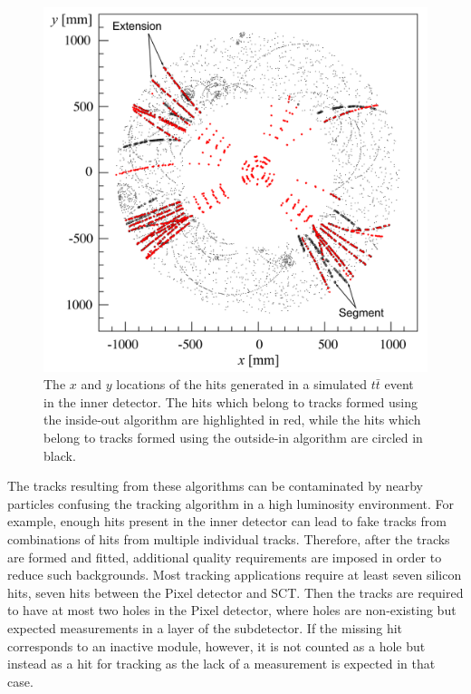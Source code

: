 \begin{figure}
\includegraphics[width=\fullfig]{figures/track_patterns.png}
\caption{The $x$ and $y$ locations of the hits generated in a simulated $t\bar{t}$ event in the inner detector. The hits which belong to tracks formed using the inside-out algorithm are highlighted in red, while the hits which belong to tracks formed using the outside-in algorithm are circled in black.}
\label{fig:track_patterns}
\end{figure}

The tracks resulting from these algorithms can be contaminated by nearby particles confusing the tracking algorithm in a high luminosity environment.
For example, enough hits present in the inner detector can lead to fake tracks from combinations of hits from multiple individual tracks.
Therefore, after the tracks are formed and fitted, additional quality requirements are imposed in order to reduce such backgrounds.
Most tracking applications require at least seven silicon hits, seven hits between the Pixel detector and \ac{SCT}.
Then the tracks are required to have at most two holes in the Pixel detector, where holes are non-existing but expected measurements in a layer of the subdetector.
If the missing hit corresponds to an inactive module, however, it is not counted as a hole but instead as a hit for tracking as the lack of a measurement is expected in that case.

